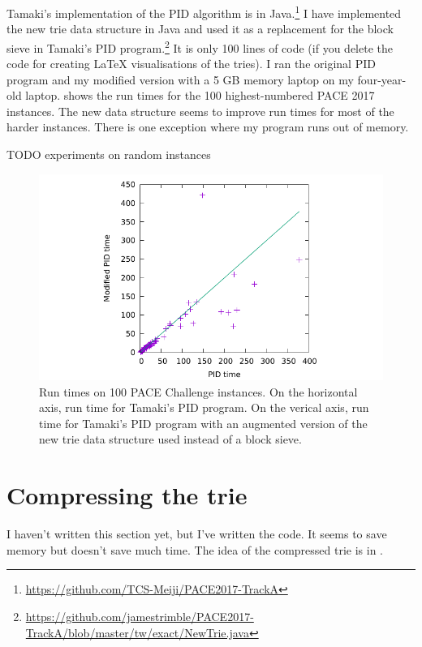 Tamaki's implementation of the PID algorithm is in
Java.\footnote{\url{https://github.com/TCS-Meiji/PACE2017-TrackA}}  I have
implemented the new trie data structure in Java and used it as a replacement
for the block sieve in Tamaki's PID
    program.\footnote{\url{https://github.com/jamestrimble/PACE2017-TrackA/blob/master/tw/exact/NewTrie.java}}
    It is only 100 lines of code (if you delete the code for creating LaTeX
    visualisations of the tries).
    I ran the original PID program and my modified version with a 5 GB memory
    laptop on my four-year-old laptop.   shows the run times
    for the 100 highest-numbered PACE 2017 instances.  The new data structure
        seems to improve run times for most of the harder instances.  There is
        one exception where my program runs out of memory.

TODO experiments on random instances

\begin{figure}[htb]
\centering
\includegraphics{50-trie/img/plot}
\caption{Run times on 100 PACE Challenge instances.  On the horizontal axis,
run time for Tamaki's PID program.  On the verical axis, run time for Tamaki's
PID program with an augmented version of the new trie data structure used
instead of a block sieve.}
\label{fig:scatter}
\end{figure}

\section{Compressing the trie}

I haven't written this section yet, but I've written the code.  It seems to save
memory but doesn't save much time.  The idea of the compressed trie is in
.

